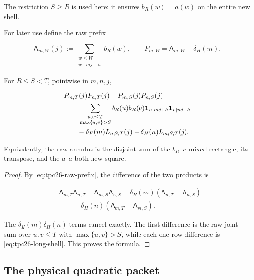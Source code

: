 The restriction \(S\ge R\) is used here: it ensures
\(b_R(w)=a(w)\) on the entire new shell.

For later use define the raw prefix

\begin{equation}
 \mathsf A_{m,W}(j)
 :=\sum_{\substack{w\le W\\w\mid mj+h}}b_R(w),
 \qquad
 P_{m,W}=\mathsf A_{m,W}-\delta_H(m).
 \label{eq:tpc26-raw-prefix}
\end{equation}

\begin{proposition}
\label{prop:tpc26-annular-identity}
For \(R\le S<T\), pointwise in \(m,n,j\),

\begin{align}
 &P_{m,T}(j)P_{n,T}(j)-P_{m,S}(j)P_{n,S}(j)
 \notag\\
 &\quad=
 \sum_{\substack{u,v\le T\\\max\{u,v\}>S}}
 b_R(u)b_R(v)
 \mathbf 1_{u\mid mj+h}\mathbf 1_{v\mid nj+h}
 \notag\\
 &\qquad
 -\delta_H(m)L_{n;S,T}(j)
 -\delta_H(n)L_{m;S,T}(j).
 \label{eq:tpc26-annular-identity}
\end{align}

Equivalently, the raw annulus is the disjoint sum of the
\(b_R\)--\(a\) mixed rectangle, its transpose, and the
\(a\)--\(a\) both-new square.
\end{proposition}

\begin{proof}
By \eqref{eq:tpc26-raw-prefix}, the difference of the two products is

\begin{align*}
 &\mathsf A_{m,T}\mathsf A_{n,T}
 -\mathsf A_{m,S}\mathsf A_{n,S}
 -\delta_H(m)(\mathsf A_{n,T}-\mathsf A_{n,S})\\
 &\qquad
 -\delta_H(n)(\mathsf A_{m,T}-\mathsf A_{m,S}).
\end{align*}

The \(\delta_H(m)\delta_H(n)\) terms cancel exactly.  The first
difference is the raw joint sum over
\(u,v\le T\) with \(\max\{u,v\}>S\), while each one-row difference
is \eqref{eq:tpc26-long-shell}.  This proves the formula.
\end{proof}

\subsection{The physical quadratic packet}

